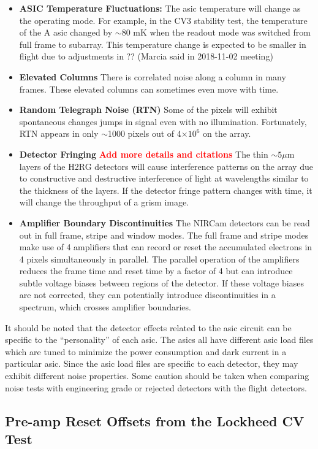 \documentclass{aastex62}
\begin{document}
\begin{itemize}[noitemsep]
	\item \textbf{ASIC Temperature Fluctuations:} The asic temperature will change as the operating mode. For example, in the CV3 stability test, the temperature of the A asic changed by $\sim$80 mK when the readout mode was switched from full frame to subarray. This temperature change is expected to be smaller in flight due to adjustments in ?? (Marcia said in 2018-11-02 meeting)
	\item \textbf{Elevated Columns} There is correlated noise along a column in many frames. These elevated columns can sometimes even move with time.
	\item \textbf{Random Telegraph Noise (RTN)} Some of the pixels will exhibit spontaneous changes jumps in signal even with no illumination. Fortunately, RTN appears in only $\sim$1000 pixels out of 4$\times 10^6$ on the array.
	\item \textbf{Detector Fringing} \textbf{\textcolor{red}{Add more details and citations}} The thin $\sim 5\mu$m layers of the H2RG detectors will cause interference patterns on the array due to constructive and destructive interference of light at wavelengths similar to the thickness of the layers. If the detector fringe pattern changes with time, it will change the throughput of a grism image.
	\item \textbf{Amplifier Boundary Discontinuities} The NIRCam detectors can be read out in full frame, stripe and window modes. The full frame and stripe modes make use of 4 amplifiers that can record or reset the accumulated electrons in 4 pixels simultaneously in parallel. The parallel operation of the amplifiers reduces the frame time and reset time by a factor of 4 but can introduce subtle voltage biases between regions of the detector. If these voltage biases are not corrected, they can potentially introduce discontinuities in a spectrum, which crosses amplifier boundaries.
\end{itemize}

It should be noted that the detector effects related to the asic circuit can be specific to the ``personality'' of each asic. The asics all have different asic load files which are tuned to minimize the power consumption and dark current in a particular asic. Since the asic load files are specific to each detector, they may exhibit different noise properties.
Some caution should be taken when comparing noise tests with engineering grade or rejected detectors with the flight detectors.

\subsection{Pre-amp Reset Offsets from the Lockheed CV Test}\label{sec:preAmp}
\end{document}
